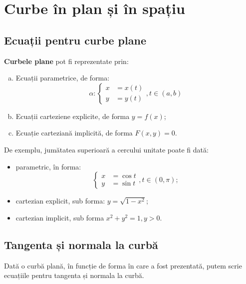 
\chapter{Curbe în plan și în spațiu}


\section{Ecuații pentru curbe plane}

\textbf{Curbele plane} pot fi reprezentate prin:
\begin{enumerate}[(a)]
  \item Ecuații parametrice, de forma:
    \[
      \alpha : \begin{cases}
        x &= x(t) \\
        y &= y(t)
      \end{cases}, t \in (a, b)
    \]
  \item Ecuații carteziene explicite, de forma $ y = f(x) $;
  \item Ecuație carteziană implicită, de forma $ F(x, y) = 0 $.
\end{enumerate}

De exemplu, jumătatea superioară a cercului unitate poate fi dată:
\begin{itemize}
  \item parametric, în forma:
    \[
      \begin{cases}
        x &= \cos t \\
        y &= \sin t
      \end{cases}, t \in (0, \pi);
    \]
  \item cartezian explicit, sub forma: $ y = \sqrt{1 - x^2} $;
  \item cartezian implicit, sub forma $ x^2 + y^2 = 1, y > 0 $.
\end{itemize}

\section{Tangenta și normala la curbă}

Dată o curbă plană, în funcție de forma în care a fost prezentată,
putem scrie ecuațiile pentru tangenta și normala la curbă.

